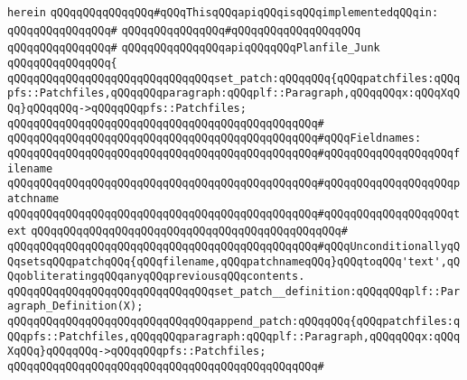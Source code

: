 \verb|herein|\newline
\newline
\verb|qQQqqQQqqQQqqQQq#qQQqThisqQQqapiqQQqisqQQqimplementedqQQqin:|\newline
\verb|qQQqqQQqqQQqqQQq#|\newline
\verb|qQQqqQQqqQQqqQQq#qQQqqQQqqQQqqQQqqQQq|\newline
\verb|qQQqqQQqqQQqqQQq#|\newline
\verb|qQQqqQQqqQQqqQQqapiqQQqqQQqPlanfile_Junk|\newline
\verb|qQQqqQQqqQQqqQQq{|\newline
\verb|qQQqqQQqqQQqqQQqqQQqqQQqqQQqqQQqset_patch:qQQqqQQq{qQQqpatchfiles:qQQqpfs::Patchfiles,qQQqqQQqparagraph:qQQqplf::Paragraph,qQQqqQQqx:qQQqXqQQq}qQQqqQQq->qQQqqQQqpfs::Patchfiles;|\newline
\verb|qQQqqQQqqQQqqQQqqQQqqQQqqQQqqQQqqQQqqQQqqQQqqQQq#|\newline
\verb|qQQqqQQqqQQqqQQqqQQqqQQqqQQqqQQqqQQqqQQqqQQqqQQq#qQQqFieldnames:|\newline
\verb|qQQqqQQqqQQqqQQqqQQqqQQqqQQqqQQqqQQqqQQqqQQqqQQq#qQQqqQQqqQQqqQQqqQQqfilename|\newline
\verb|qQQqqQQqqQQqqQQqqQQqqQQqqQQqqQQqqQQqqQQqqQQqqQQq#qQQqqQQqqQQqqQQqqQQqpatchname|\newline
\verb|qQQqqQQqqQQqqQQqqQQqqQQqqQQqqQQqqQQqqQQqqQQqqQQq#qQQqqQQqqQQqqQQqqQQqtext|\newline
\verb|qQQqqQQqqQQqqQQqqQQqqQQqqQQqqQQqqQQqqQQqqQQqqQQq#|\newline
\verb|qQQqqQQqqQQqqQQqqQQqqQQqqQQqqQQqqQQqqQQqqQQqqQQq#qQQqUnconditionallyqQQqsetsqQQqpatchqQQq{qQQqfilename,qQQqpatchnameqQQq}qQQqtoqQQq'text',qQQqobliteratingqQQqanyqQQqpreviousqQQqcontents.|\newline
\newline
\verb|qQQqqQQqqQQqqQQqqQQqqQQqqQQqqQQqset_patch__definition:qQQqqQQqplf::Paragraph_Definition(X);|\newline
\newline
\newline
\newline
\verb|qQQqqQQqqQQqqQQqqQQqqQQqqQQqqQQqappend_patch:qQQqqQQq{qQQqpatchfiles:qQQqpfs::Patchfiles,qQQqqQQqparagraph:qQQqplf::Paragraph,qQQqqQQqx:qQQqXqQQq}qQQqqQQq->qQQqqQQqpfs::Patchfiles;|\newline
\verb|qQQqqQQqqQQqqQQqqQQqqQQqqQQqqQQqqQQqqQQqqQQqqQQq#|\newline
